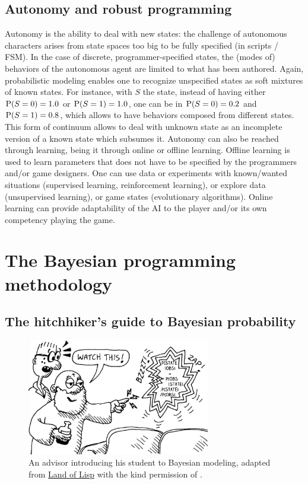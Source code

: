 \subsection{Autonomy and robust programming}
Autonomy is the ability to deal with new states: the challenge of autonomous characters arises from state spaces too big to be fully specified (in scripts / FSM). In the case of discrete, programmer-specified states, the (modes of) behaviors of the autonomous agent are limited to what has been authored. Again, probabilistic modeling enables one to recognize unspecified states as soft mixtures of known states. For instance, with $S$ the state, instead of having either $\mathrm{P}(S=0)=1.0$ or $\mathrm{P}(S=1)=1.0$, one can be in $\mathrm{P}(S=0)=0.2$ and $\mathrm{P}(S=1)=0.8$, which allows to have behaviors composed from different states. This form of continuum allows to deal with unknown state as an incomplete version of a known state which subsumes it. Autonomy can also be reached through learning, being it through online or offline learning. Offline learning is used to learn parameters that does not have to be specified by the programmers and/or game designers. One can use data or experiments with known/wanted situations (supervised learning, reinforcement learning), or explore data (unsupervised learning), or game states (evolutionary algorithms). Online learning can provide adaptability of the AI to the player and/or its own competency playing the game. %


\section{The Bayesian programming methodology}

\subsection{The hitchhiker's guide to Bayesian probability}
\begin{figure}[h]
\centering
\includegraphics[width=8cm]{images/zapBayes3.png}
\caption{An advisor introducing his student to Bayesian modeling, adapted from \underline{Land of Lisp} with the kind permission of \cite{LoL}.}
\end{figure}


